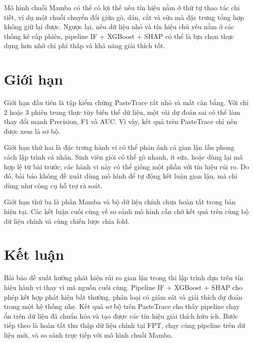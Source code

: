 \documentclass[runningheads]{llncs}
\begin{document}
Mô hình chuỗi Mamba có thể có lợi thế nếu tín hiệu nằm ở thứ tự thao tác chi
tiết, ví dụ một chuỗi chuyển đổi giữa gõ, dán, cắt và sửa mà đặc trưng tổng hợp
không giữ lại được. Ngược lại, nếu dữ liệu nhỏ và tín hiệu chủ yếu nằm ở các
thống kê cấp phiên, pipeline IF + XGBoost + SHAP có thể là lựa chọn thực dụng
hơn nhờ chi phí thấp và khả năng giải thích tốt.

\section{Giới hạn}
\label{sec:limitations}

Giới hạn đầu tiên là tập kiểm chứng PasteTrace rất nhỏ và mất cân bằng. Với chỉ
2 hoặc 3 phiên trung thực tùy biến thể dữ liệu, một vài dự đoán sai có thể làm
thay đổi mạnh Precision, F1 và AUC. Vì vậy, kết quả trên PasteTrace chỉ nên
được xem là sơ bộ.

Giới hạn thứ hai là đặc trưng hành vi có thể phản ánh cả gian lận lẫn phong
cách lập trình cá nhân. Sinh viên giỏi có thể gõ nhanh, ít sửa, hoặc dùng lại
mã hợp lệ từ bài trước; các hành vi này có thể giống một phần với tín hiệu rủi
ro. Do đó, bài báo không đề xuất dùng mô hình để tự động kết luận gian lận, mà
chỉ dùng như công cụ hỗ trợ rà soát.

Giới hạn thứ ba là phần Mamba và bộ dữ liệu chính chưa hoàn tất trong bản hiện
tại. Các kết luận cuối cùng về so sánh mô hình cần chờ kết quả trên cùng bộ dữ
liệu chính và cùng chiến lược chia fold.

\section{Kết luận}
\label{sec:conclusion}

Bài báo đề xuất hướng phát hiện rủi ro gian lận trong thi lập trình dựa trên
tín hiệu hành vi thay vì mã nguồn cuối cùng. Pipeline IF + XGBoost + SHAP cho
phép kết hợp phát hiện bất thường, phân loại có giám sát và giải thích dự đoán
trong một hệ thống nhẹ. Kết quả sơ bộ trên PasteTrace cho thấy pipeline chạy ổn
trên dữ liệu đã chuẩn hóa và tạo được các tín hiệu giải thích hữu ích. Bước tiếp
theo là hoàn tất thu thập dữ liệu chính tại FPT, chạy cùng pipeline trên dữ
liệu mới, và so sánh trực tiếp với mô hình chuỗi Mamba.
\end{document}
